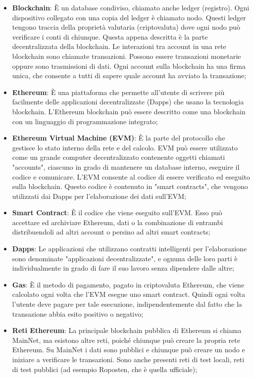 \begin{itemize}
\item \textbf{Blockchain}: È un database condiviso, chiamato anche ledger (registro). Ogni dispositivo collegato con una copia del ledger \`e chiamato nodo. Questi ledger tengono traccia della propriet\`a valutaria (criptovaluta) dove ogni nodo pu\`o verificare i conti di chiunque. Questa appena descritta \`e la parte decentralizzata della blockchain. Le interazioni tra account in una rete blockchain sono chiamate transazioni. Possono essere transazioni monetarie oppure sono trasmissioni di dati. Ogni account sulla blockchain ha una firma unica, che consente a tutti di sapere quale account ha avviato la transazione;
\item \textbf{Ethereum}: È una piattaforma che permette all'utente di scrivere pi\`u facilmente delle applicazioni decentralizzate (Dapps) che usano la tecnologia blockchain. L'Ethereum blockchain pu\`o essere descritto come una blockchain con un linguaggio di programmazione integrato;
\item \textbf{Ethereum Virtual Machine (EVM)}: È la parte del protocollo che gestisce lo stato interno della rete e del calcolo. EVM pu\`o essere utilizzato come un grande computer decentralizzato contenente oggetti chiamati "accounts", ciascuno in grado di mantenere un database interno, eseguire il codice e comunicare. L'EVM consente al codice di essere verificato ed eseguito sulla blockchain. Questo codice è contenuto in "smart contracts", che vengono utilizzati dai Dapps per l'elaborazione dei dati sull'EVM;
\item \textbf{Smart Contract}: È il codice che viene eseguito sull'EVM. Esso pu\`o accettare ed archiviare Ethereum, dati o la combinazione di entrambi distribuendoli ad altri account o persino ad altri smart contracts;
\item \textbf{Dapps}: Le applicazioni che utilizzano contratti intelligenti per l'elaborazione sono denominate "applicazioni decentralizzate", e ognuna delle loro parti \`e individualmente in grado di fare il suo lavoro senza dipendere dalle altre;
\item \textbf{Gas}: È il metodo di pagamento, pagato in criptovaluta Ethereum, che viene calcolato ogni volta che l'EVM esegue uno smart contract. Quindi ogni volta l'utente deve pagare per tale esecuzione, indipendentemente dal fatto che la transazione abbia esito positivo o negativo;
\item \textbf{Reti Ethereum}: La principale blockchain pubblica di Ethereum si chiama MainNet, ma esistono altre reti, poich\'e chiunque pu\`o creare la propria rete Ethereum. Su MainNet i dati sono pubblici e chiunque pu\`o creare un nodo e iniziare a verificare le transazioni. Sono anche presenti reti di test locali, reti di test pubblici (ad esempio Roposten, che \`e quella ufficiale);

\end{itemize}
